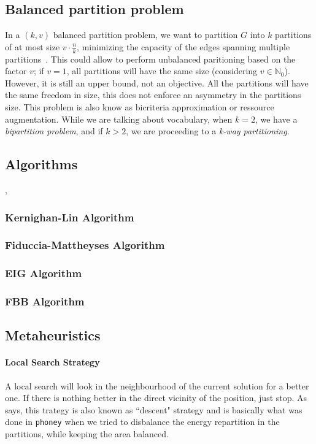 \documentclass[12pt,a4paper]{article}
\theoremstyle{customdef}
\begin{document}
\subsection{Balanced partition problem}
In a $(k, v)$ balanced partition problem, we want to partition $G$ into $k$ partitions of at most size $v\cdot\frac{n}{k}$, minimizing the capacity of the edges spanning multiple partitions~\cite{Andreev:2004:BGP:1007912.1007931}.
This could allow to perform unbalanced paritioning based on the factor $v$; if $v = 1$, all partitions will have the same size (considering $v \in \mathbb{N}_0$).
However, it is still an upper bound, not an objective.
All the partitions will have the same freedom in size, this does not enforce an asymmetry in the partitions size.
This problem is also know as bicriteria approximation or ressource augmentation.
While we are talking about vocabulary, when $k=2$, we have a \textit{bipartition problem}, and if $k>2$, we are proceeding to a \textit{k-way partitioning}.

\subsection{Algorithms}
\cite{SungKyuLim:ECE6133:partitioning}, \cite{Lim2008}
\subsubsection{Kernighan-Lin Algorithm~\citep*{Kernighan1970}}

\subsubsection{Fiduccia-Mattheyses Algorithm~\citep*{Fiduccia1982}}

\subsubsection{EIG Algorithm~\citep*{Wei1989}}

\subsubsection{FBB Algorithm~\citep*{Yang1996}}

\subsection{Metaheuristics}

\paragraph{Local Search Strategy}
A local search will look in the neighbourhood of the current solution for a better one.
If there is nothing better in the direct vicinity of the position, just stop.
As \cite{Pirlot1996} says, this trategy is also known as ``descent" strategy and is basically what was done in \texttt{phoney} when we tried to disbalance the energy repartition in the partitions, while keeping the area balanced.
\end{document}
